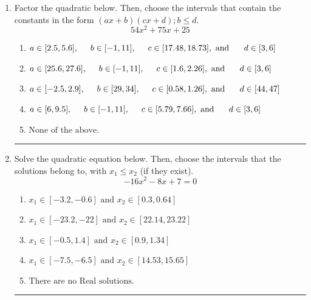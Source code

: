 \documentclass[14pt]{extbook}
\newcommand{\litem}[1]{\item#1\hspace*{-1cm}\rule{\textwidth}{0.4pt}}
\begin{document}
\begin{enumerate}
{\begin{enumerate}[label=\Alph*.]
\end{enumerate} }
\litem{
Factor the quadratic below. Then, choose the intervals that contain the constants in the form $(ax+b)(cx+d); b \leq d.$\[ 54x^{2} +75 x + 25 \]\begin{enumerate}[label=\Alph*.]
\item \( a \in [2.5, 5.6], \hspace*{5mm} b \in [-1, 11], \hspace*{5mm} c \in [17.48, 18.73], \text{ and } \hspace*{5mm} d \in [3, 6] \)
\item \( a \in [25.6, 27.6], \hspace*{5mm} b \in [-1, 11], \hspace*{5mm} c \in [1.6, 2.26], \text{ and } \hspace*{5mm} d \in [3, 6] \)
\item \( a \in [-2.5, 2.9], \hspace*{5mm} b \in [29, 34], \hspace*{5mm} c \in [0.58, 1.26], \text{ and } \hspace*{5mm} d \in [44, 47] \)
\item \( a \in [6, 9.5], \hspace*{5mm} b \in [-1, 11], \hspace*{5mm} c \in [5.79, 7.66], \text{ and } \hspace*{5mm} d \in [3, 6] \)
\item \( \text{None of the above.} \)

\end{enumerate} }
\litem{
Solve the quadratic equation below. Then, choose the intervals that the solutions belong to, with $x_1 \leq x_2$ (if they exist).\[ -16x^{2} -8 x + 7 = 0 \]\begin{enumerate}[label=\Alph*.]
\item \( x_1 \in [-3.2, -0.6] \text{ and } x_2 \in [0.3, 0.64] \)
\item \( x_1 \in [-23.2, -22] \text{ and } x_2 \in [22.14, 23.22] \)
\item \( x_1 \in [-0.5, 1.4] \text{ and } x_2 \in [0.9, 1.34] \)
\item \( x_1 \in [-7.5, -6.5] \text{ and } x_2 \in [14.53, 15.65] \)
\item \( \text{There are no Real solutions.} \)


\end{enumerate}}
\end{enumerate}
\end{document}
